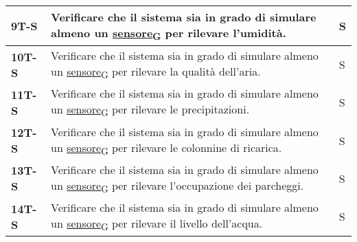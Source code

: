 \begin{longtable}{|>{\raggedright\arraybackslash}m{}|>{\raggedright\arraybackslash}m{}|>{\raggedright\arraybackslash}m{}|}
	\hline
	\textbf{9T-S}   & Verificare che il sistema sia in grado di simulare almeno un \href{https://7last.github.io/docs/pb/documentazione-interna/glossario\#sensore}{sensore\textsubscript{G}} per rilevare l'umidità.                                                                                                                                                                                                          & S              \\
	\hline
	\textbf{10T-S}  & Verificare che il sistema sia in grado di simulare almeno un \href{https://7last.github.io/docs/pb/documentazione-interna/glossario\#sensore}{sensore\textsubscript{G}} per rilevare la qualità dell'aria.                                                                                                                                                                                               & S              \\
	\hline
	\textbf{11T-S}  & Verificare che il sistema sia in grado di simulare almeno un \href{https://7last.github.io/docs/pb/documentazione-interna/glossario\#sensore}{sensore\textsubscript{G}} per rilevare le precipitazioni.                                                                                                                                                                                                  & S              \\
	\hline
	\textbf{12T-S}  & Verificare che il sistema sia in grado di simulare almeno un \href{https://7last.github.io/docs/pb/documentazione-interna/glossario\#sensore}{sensore\textsubscript{G}} per rilevare le colonnine di ricarica.                                                                                                                                                                                           & S              \\
	\hline
	\textbf{13T-S}  & Verificare che il sistema sia in grado di simulare almeno un \href{https://7last.github.io/docs/pb/documentazione-interna/glossario\#sensore}{sensore\textsubscript{G}} per rilevare l'occupazione dei parcheggi.                                                                                                                                                                                        & S              \\
	\hline
	\textbf{14T-S}  & Verificare che il sistema sia in grado di simulare almeno un \href{https://7last.github.io/docs/pb/documentazione-interna/glossario\#sensore}{sensore\textsubscript{G}} per rilevare il livello dell'acqua.                                                                                                                                                                                              & S              \\

\end{longtable}

